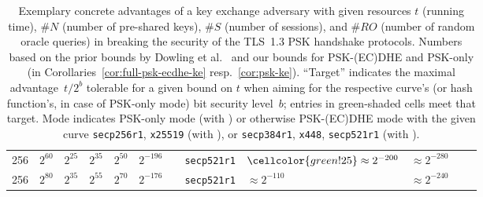 \begin{table}[t]
\begin{tabular}{@{}llllllllllll@{}}
	\midrule
	256 & $2^{60}$ & $2^{25}$ & $2^{35}$ & $2^{50}$ & $2^{-196}$ && \texttt{secp521r1} & $\cellcolor{green!25}\approx 2^{-200}$ 	&\cellcolor{green!25}$\approx 2^{-280}$ 	\\ 
	256 & $2^{80}$ & $2^{35}$ & $2^{55}$ & $2^{70}$ & $2^{-176}$ && \texttt{secp521r1} & $\approx 2^{-110}$	&\cellcolor{green!25}$\approx 2^{-240}$ 	\\ 
		\bottomrule
		\end{tabular}

		\medskip
		
		\caption{%
			Exemplary concrete advantages of a key exchange adversary with given resources $t$ (running time), $\#N$ (number of pre-shared keys), $\#S$ (number of sessions), and $\#RO$ (number of random oracle queries) in breaking the security of the TLS~1.3 PSK handshake protocols.
			Numbers based on the prior bounds by Dowling et al.~\cite{JC:DFGS21}
			and our bounds for PSK-(EC)DHE and PSK-only (in Corollaries~\ref{cor:full-psk-ecdhe-ke} resp.~\ref{cor:psk-ke}).
			``Target'' indicates the maximal advantage~$t/2^b$ tolerable for a given bound on $t$ when aiming for the respective curve's (or hash function's, in case of PSK-only mode) bit security level~$b$;
			entries in \colorbox{green!25}{green}-shaded cells meet that target.
			Mode indicates PSK-only mode (with ) or otherwise PSK-(EC)DHE mode with the given curve \texttt{secp256r1}, \texttt{x25519} (with ), or \texttt{secp384r1}, \texttt{x448}, \texttt{secp521r1} (with ).
		}
		\label{tbl:bounds-overview}
	\end{table}
\fi


